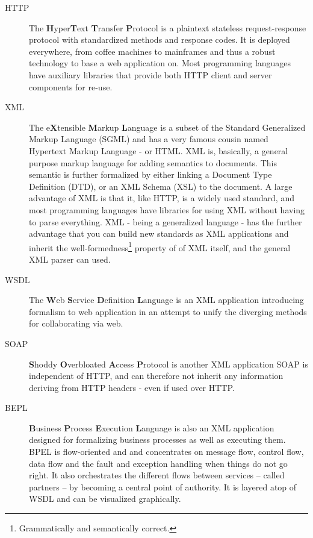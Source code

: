 \begin{description}
\item[HTTP] The \textbf{H}yper\textbf{T}ext \textbf{T}ransfer \textbf{P}rotocol is a plaintext stateless request-response protocol with standardized methods and response codes. It is deployed everywhere, from coffee machines to mainframes and thus a robust technology to base a web application on. Most programming languages have auxiliary libraries that provide both HTTP client and server components for re-use.

\item[XML] The e\textbf{X}tensible \textbf{M}arkup \textbf{L}anguage is a subset of the Standard Generalized Markup Language (SGML) and has a very famous cousin named Hypertext Markup Language - or HTML. XML is, basically, a general purpose markup language for adding semantics to documents. This semantic is further formalized by either linking a Document Type Definition (DTD), or an XML Schema (XSL) to the document. A large advantage of XML is that it, like HTTP, is a widely used standard, and most programming languages have libraries for using XML without having to parse everything. XML - being a generalized language - has the further advantage that you can build new standards as XML applications and inherit the well-formedness\footnote{Grammatically and semantically correct.} property of of XML itself, and the general XML parser can used.

\item[WSDL] The \textbf{W}eb \textbf{S}ervice \textbf{D}efinition \textbf{L}anguage is an XML application introducing formalism to web application in an attempt to unify the diverging methods for collaborating via web.

\item[SOAP] \textbf{S}hoddy \textbf{O}verbloated \textbf{A}ccess \textbf{P}rotocol is another XML application %
SOAP is independent of HTTP, and can therefore not inherit any information deriving from HTTP headers - even if used over HTTP.

\item[BEPL] \textbf{B}usiness \textbf{P}rocess \textbf{E}xecution \textbf{L}anguage is also an XML application designed for formalizing business processes as well as executing them. BPEL is flow-oriented and and concentrates on message flow, control flow, data flow and the fault and exception handling when things do not go right. It also orchestrates the different flows between services -- called partners -- by becoming a central point of authority. It is layered atop of WSDL and can be visualized graphically.


\end{description}

